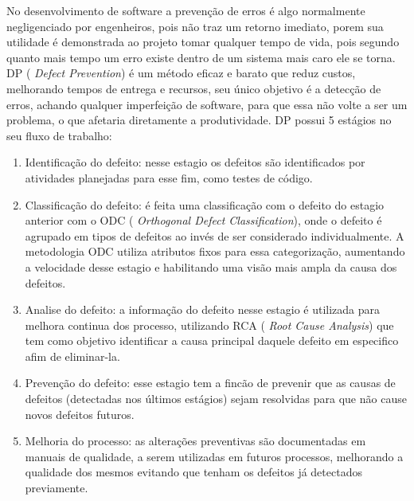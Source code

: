 \documentclass[12pt]{article}
\begin{document}
No desenvolvimento de software a prevenção de erros é algo normalmente negligenciado por engenheiros, pois não traz um retorno imediato, porem sua utilidade é demonstrada ao projeto tomar qualquer tempo de vida, pois segundo \cite{kumaresh2010defect} quanto mais tempo um erro existe dentro de um sistema mais caro ele se torna.
DP ( \textit{Defect Prevention}) é um método eficaz e barato que reduz custos, melhorando tempos de entrega e recursos, seu único objetivo é a detecção de erros, achando qualquer imperfeição de software, para que essa não volte a ser um problema, o que afetaria diretamente a produtividade.
DP possui 5 estágios no seu fluxo de trabalho:
\begin{enumerate}
    \item Identificação do defeito: nesse estagio os defeitos são identificados por atividades planejadas para esse fim, como testes de código.
    \item Classificação do defeito: é feita uma classificação com o defeito do estagio anterior com o ODC ( \textit{Orthogonal Defect Classification}), onde o defeito é agrupado em tipos de defeitos ao invés de ser considerado individualmente. A metodologia ODC utiliza atributos fixos para essa categorização, aumentando a velocidade desse estagio e habilitando uma visão mais ampla da causa dos defeitos.
    \item Analise do defeito: a informação do defeito nesse estagio é utilizada para melhora continua dos processo, utilizando RCA ( \textit{Root Cause Analysis}) que tem como objetivo identificar a causa principal daquele defeito em especifico afim de eliminar-la.
    \item Prevenção do defeito: esse estagio tem a fincão de prevenir que as causas de defeitos (detectadas nos últimos estágios) sejam resolvidas para que não cause novos defeitos futuros.
    \item Melhoria do processo: as alterações preventivas são documentadas em manuais de qualidade, a serem utilizadas em futuros processos, melhorando a qualidade dos mesmos evitando que tenham os defeitos já detectados previamente.
\end{enumerate}
\end{document}
